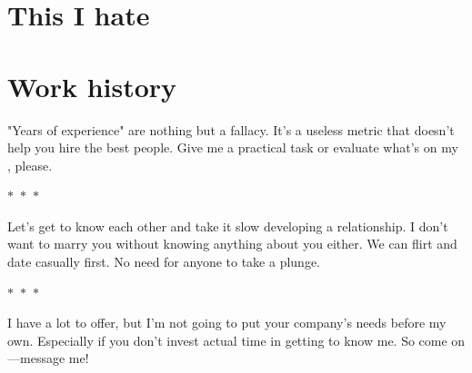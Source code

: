 \documentclass[11pt,a4paper,sans]{moderncv} %
\begin{document}
\section{This I hate}

\section{Work history}

"Years of experience" are nothing but a fallacy. It's a useless metric that doesn't help you hire the best people.
Give me a practical task or evaluate what's on my , please.
\begin{center}
  $\ast$~$\ast$~$\ast$
\end{center}
Let's get to know each other and take it slow developing a relationship.
I don't want to marry you without knowing anything about you either. We can flirt and date casually first. No need for anyone to take a plunge.
\begin{center}
  $\ast$~$\ast$~$\ast$
\end{center}
I have a lot to offer, but I'm not going to put your company's needs before my own. Especially if you don't invest actual time in getting to know me. So come on---message me!





\end{document}
